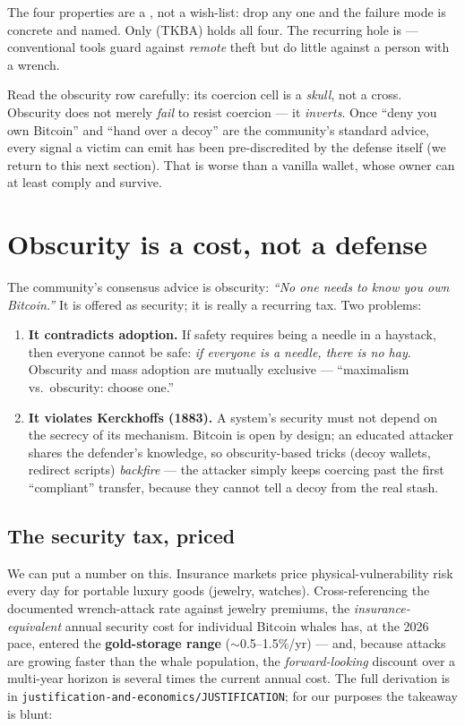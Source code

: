 \documentclass[a4paper,11pt]{report}
\begin{document}
\begin{keyidea}
The four properties are a , not a wish-list: drop any one and
the failure mode is concrete and named. Only \GW{} (TKBA) holds all four. The
recurring hole is  --- conventional tools guard against
\emph{remote} theft but do little against a person with a wrench.
\end{keyidea}

\noindent Read the obscurity row carefully: its coercion cell is a \emph{skull},
not a cross. Obscurity does not merely \emph{fail} to resist coercion --- it
\emph{inverts}. Once ``deny you own Bitcoin'' and ``hand over a decoy'' are the
community's standard advice, every signal a victim can emit has been
pre-discredited by the defense itself (we return to this next section). That is
worse than a vanilla wallet, whose owner can at least comply and survive.

\section{Obscurity is a cost, not a defense}
The community's consensus advice is obscurity: \emph{``No one needs to know you
own Bitcoin.''} It is offered as security; it is really a recurring tax. Two
problems:

\begin{enumerate}[leftmargin=1.4em,nosep]
\item \textbf{It contradicts adoption.} If safety requires being a needle in a
haystack, then everyone cannot be safe: \emph{if everyone is a needle, there is
no hay}. Obscurity and mass adoption are mutually exclusive — ``maximalism vs.\
obscurity: choose one.''
\item \textbf{It violates Kerckhoffs (1883).} A system's security must not depend
on the secrecy of its mechanism. Bitcoin is open by design; an educated attacker
shares the defender's knowledge, so obscurity-based tricks (decoy wallets,
redirect scripts) \emph{backfire} — the attacker simply keeps coercing past the
first ``compliant'' transfer, because they cannot tell a decoy from the real
stash.
\end{enumerate}

\subsection{The security tax, priced}
We can put a number on this. Insurance markets price physical-vulnerability risk
every day for portable luxury goods (jewelry, watches). Cross-referencing the
documented wrench-attack rate against jewelry premiums, the
\emph{insurance-equivalent} annual security cost for individual Bitcoin whales
has, at the 2026 pace, entered the \textbf{gold-storage range} ($\sim$0.5–1.5\%/yr)
— and, because attacks are growing faster than the whale population, the
\emph{forward-looking} discount over a multi-year horizon is several times the
current annual cost. The full derivation is in
\texttt{justification-and-economics/JUSTIFICATION}; for our purposes the
takeaway is blunt:
\end{document}
